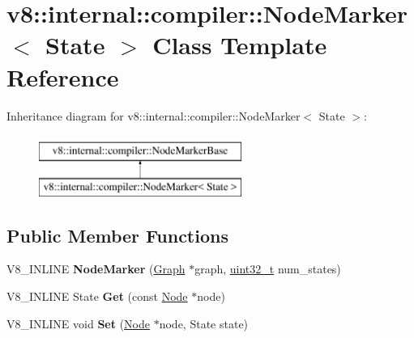\hypertarget{classv8_1_1internal_1_1compiler_1_1NodeMarker}{}\section{v8\+:\+:internal\+:\+:compiler\+:\+:Node\+Marker$<$ State $>$ Class Template Reference}
\label{classv8_1_1internal_1_1compiler_1_1NodeMarker}
Inheritance diagram for v8\+:\+:internal\+:\+:compiler\+:\+:Node\+Marker$<$ State $>$\+:\begin{figure}[H]
\begin{center}
\leavevmode
\includegraphics[height=2.000000cm]{classv8_1_1internal_1_1compiler_1_1NodeMarker}
\end{center}
\end{figure}
\subsection*{Public Member Functions}
\begin{DoxyCompactItemize}
\item 
\mbox{\label{classv8_1_1internal_1_1compiler_1_1NodeMarker_afa83d6803e39a8a701ceeea579773e48}} 
V8\+\_\+\+I\+N\+L\+I\+NE {\bfseries Node\+Marker} (\mbox{\hyperlink{classv8_1_1internal_1_1compiler_1_1Graph}{Graph}} $\ast$graph, \mbox{\hyperlink{classuint32__t}{uint32\+\_\+t}} num\+\_\+states)
\item 
\mbox{\label{classv8_1_1internal_1_1compiler_1_1NodeMarker_a7378a681001b4a1c2012dab250ec6794}} 
V8\+\_\+\+I\+N\+L\+I\+NE State {\bfseries Get} (const \mbox{\hyperlink{classv8_1_1internal_1_1compiler_1_1Node}{Node}} $\ast$node)
\item 
\mbox{\label{classv8_1_1internal_1_1compiler_1_1NodeMarker_a6a44f8d846c668f25e36433d4eb00335}} 
V8\+\_\+\+I\+N\+L\+I\+NE void {\bfseries Set} (\mbox{\hyperlink{classv8_1_1internal_1_1compiler_1_1Node}{Node}} $\ast$node, State state)
\end{DoxyCompactItemize}


